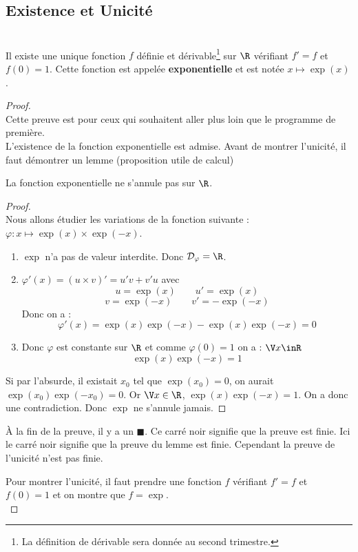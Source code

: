 \documentclass[12pt,fleqn]{report} %
\begin{document}
\subsection{Existence et Unicité}
\begin{theorem}\text{ }\\
	Il existe une unique fonction $f$ définie et dérivable\footnote{La définition de dérivable sera donnée au second trimestre.} sur $\R$ vérifiant $f' = f$ et $f(0) = 1$. Cette fonction est appelée \textbf{exponentielle} et est notée $x\mapsto\exp(x)$.
\end{theorem}
\begin{proof}\text{ }\\
	Cette preuve est pour ceux qui souhaitent aller plus loin que le programme de première.\\
	
	L'existence de la fonction exponentielle est admise. 
	Avant de montrer l'unicité, il faut démontrer un lemme (proposition utile de calcul)
	\begin{lemme}
		La fonction exponentielle ne s'annule pas sur $\R$.
	\end{lemme}
	\begin{proof}\text{ }\\
		Nous allons étudier les variations de la fonction suivante :  $\varphi : x \mapsto \exp(x) \times \exp(-x)$.
		\begin{enumerate}
			\item $\exp$ n'a pas de valeur interdite. Donc $\mathcal{D}_\varphi = \R$.
			\item $\varphi'(x) = (u \times v)' = u'v + v'u$ avec \[
			u = \exp(x) \qquad u' = \exp(x)
			\]
			\[
			v = \exp(-x) \qquad v' = - \exp(-x)
			\]
			Donc on a :
			\[
			\varphi'(x) = \exp(x)\exp(-x) - \exp(x)\exp(-x) = 0
			\]
			
			\item Donc $\varphi$ est constante sur $\R$ et comme $\varphi(0) = 1$ on a : $\V x \inR$
			\[\exp(x)\exp(-x) = 1 \]
		\end{enumerate}
		
		Si par l'absurde, il existait $x_0$ tel que $\exp(x_0) = 0$, on aurait $\exp(x_0) \exp(-x_0) = 0$. Or $\V x \in \R$, $\exp(x)\exp(-x) = 1$. On a donc une contradiction. Donc $\exp$ ne s'annule jamais.
	\end{proof}
	\begin{remark}
		À la fin de la preuve, il y a un $\blacksquare$. Ce carré noir signifie que la preuve est finie. Ici le carré noir signifie que la preuve du lemme est finie. Cependant la preuve de l'unicité n'est pas finie.
	\end{remark}
	Pour montrer l'unicité, il faut prendre une fonction $f$ vérifiant $f' = f$ et $f(0) = 1$ et on montre que $f = \exp$.\\
	

\end{proof}
\end{document}
